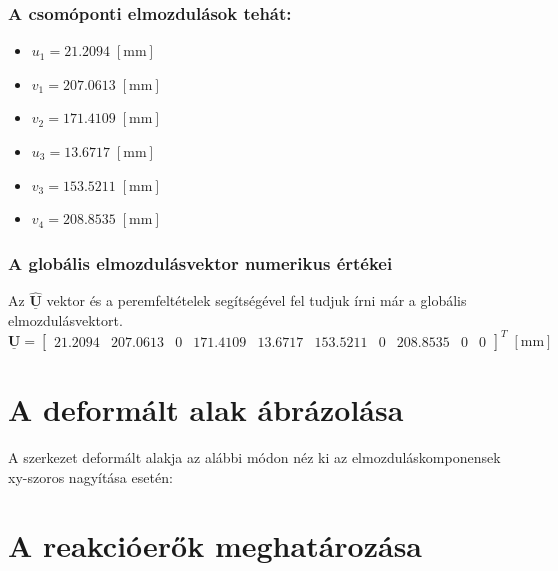 \documentclass[12pt,a4paper]{article}
\def\vec#1{\underline{\mathbf{#1}}}
\def\mili{\; \left[\mathrm{mm}\right]}
\begin{document}
\subsubsection*{A csomóponti elmozdulások tehát:}
\begin{multicols}{2}
    \begin{itemize}
        \item $u_1=21.2094 \mili$
        \item $v_1=207.0613 \mili$
        \item $v_2=171.4109 \mili$
    \end{itemize}
    \columnbreak
    \begin{itemize}
        \item $u_3=13.6717 \mili$
        \item $v_3=153.5211 \mili$
        \item $v_4=208.8535 \mili$
    \end{itemize}
\end{multicols}
\subsubsection{A globális elmozdulásvektor numerikus értékei}
Az $\vec{\hat{U}}$ vektor és a peremfeltételek segítségével fel tudjuk írni már
a globális elmozdulásvektort.
\begin{equation}
    \vec{U}=
    \begin{bmatrix}
        21.2094  &
        207.0613 &
        0        &
        171.4109 &
        13.6717  &
        153.5211 &
        0        &
        208.8535 &
        0        &
        0
    \end{bmatrix}^{T} \mili
\end{equation}
\section{A deformált alak ábrázolása}
A szerkezet deformált alakja az alábbi módon néz ki az elmozduláskomponensek xy-szoros
nagyítása esetén:

\section{A reakcióerők meghatározása}
\end{document}
